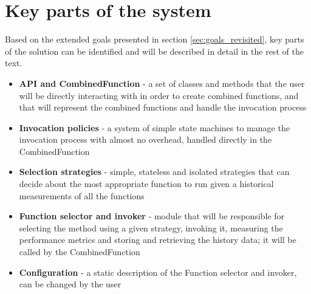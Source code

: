\section{Key parts of the system}

Based on the extended goals presented in section \ref{sec:goals_revisited}, key parts of the solution can be identified and will be described in detail in the rest of the text.

\begin{itemize}
	\item \textbf{API and CombinedFunction} - a set of classes and methods that the user will be directly interacting with in order to create combined functions, and that will represent the combined functions and handle the invocation process
	\item \textbf{Invocation policies} - a system of simple state machines to manage the invocation process with almost no overhead, handled directly in the CombinedFunction
	\item \textbf{Selection strategies} - simple, stateless and isolated strategies that can decide about the most appropriate function to run given a historical measurements of all the functions
	\item \textbf{Function selector and invoker} - module that will be responsible for selecting the method using a given strategy, invoking it, measuring the performance metrics and storing and retrieving the history data; it will be called by the CombinedFunction
	\item \textbf{Configuration} - a static description of the Function selector and invoker, can be changed by the user
\end{itemize}